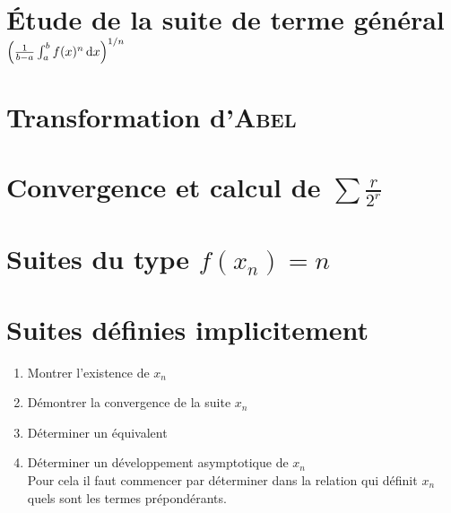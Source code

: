 \section{Étude de la suite de terme général \texorpdfstring{$\left( \frac{1}{b-a} \int_{a}^{b} f(x)^n \, \mathrm{d} x \right)^{1/n}$}{égal à une intégrale}}


\section{Transformation d'\textsc{Abel}} \label{transformation_abel}


\section{Convergence et calcul de  \texorpdfstring{$\sum \frac{r}{2^r}$}{de la série de terme général r/2^r}}


\section{Suites du type \texorpdfstring{$f(x_n) = n$}{f(x_n) = n}}


\section{Suites définies implicitement}

\begin{methode}
    \begin{enumerate}
        \item Montrer l'existence de $x_n$
        \item Démontrer la convergence de la suite $x_n$
        \item Déterminer un équivalent 
        \item Déterminer un développement asymptotique de $x_n$ \\
        Pour cela il faut commencer par déterminer dans la relation qui définit $x_n$ quels sont les termes prépondérants. 
    \end{enumerate}
\end{methode}

